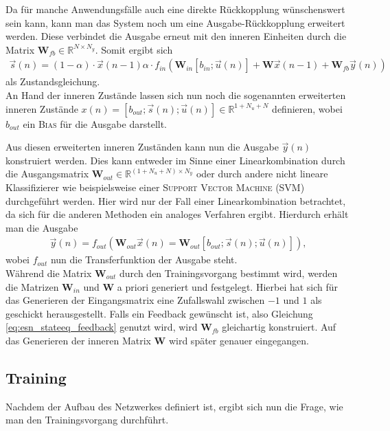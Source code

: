Da für manche Anwendungsfälle auch eine direkte Rückkopplung wünschenswert sein kann, kann man das System noch um eine Ausgabe-Rückkopplung erweitert werden. Diese verbindet die Ausgabe erneut mit den inneren Einheiten durch die Matrix $\mathbf{W}_{fb} \in \mathbb{R}^{N \times N_y}$.
Somit ergibt sich 
\begin{align}
\label{eq:esn_stateeq_feedback}
\vec{s}(n) = (1 - \alpha) \cdot \vec{x}(n-1)  \alpha \cdot f_{in}\left( \mathbf{W}_{in} [b_{in}; \vec{u}(n)] + \mathbf{W} \vec{x}(n-1) + \mathbf{W}_{fb} \vec{y}(n) \right)
\end{align}
als Zustandsgleichung.\\

An Hand der inneren Zustände lassen sich nun noch die sogenannten erweiterten inneren Zustände $x(n) = [b_{out}; \vec{s}(n); \vec{u}(n)] \in \mathbb{R}^{1 + N_u + N}$ definieren, wobei $b_{out}$ ein \textsc{Bias} für die Ausgabe darstellt. 

Aus diesen erweiterten inneren Zuständen kann nun die Ausgabe $\vec{y}(n)$ konstruiert werden. Dies kann entweder im Sinne einer Linearkombination durch die Ausgangsmatrix $\mathbf{W}_{out} \in \mathbb{R}^{(1 + N_u + N) \times N_y}$ oder durch andere nicht lineare Klassifizierer wie beispielsweise einer \textsc{Support Vector Machine (SVM)} durchgeführt werden. Hier wird nur der Fall einer Linearkombination betrachtet, da sich für die anderen Methoden ein analoges Verfahren ergibt.
Hierdurch erhält man die Ausgabe
\begin{align}
\vec{y}(n) = f_{out} \left( \mathbf{W}_{out} \vec{x}(n) = \mathbf{W}_{out} [b_{out}; \vec{s}(n); \vec{u}(n)] \right),
\end{align}
wobei $f_{out}$ nun die Transferfunktion der Ausgabe steht.\\

Während die Matrix $\mathbf{W}_{out}$ durch den Trainingsvorgang bestimmt wird, werden die Matrizen $\mathbf{W}_{in}$ und $\mathbf{W}$ a priori generiert und festgelegt. Hierbei hat sich für das Generieren der Eingangsmatrix eine Zufallswahl zwischen $-1$ und $1$ als geschickt herausgestellt. Falls ein Feedback gewünscht ist, also Gleichung \ref{eq:esn_stateeq_feedback} genutzt wird, wird $\mathbf{W}_{fb}$ gleichartig konstruiert. Auf das Generieren der inneren Matrix $\mathbf{W}$ wird später genauer eingegangen.

\subsection{Training}
Nachdem der Aufbau des Netzwerkes definiert ist, ergibt sich nun die Frage, wie man den Trainingsvorgang durchführt.

